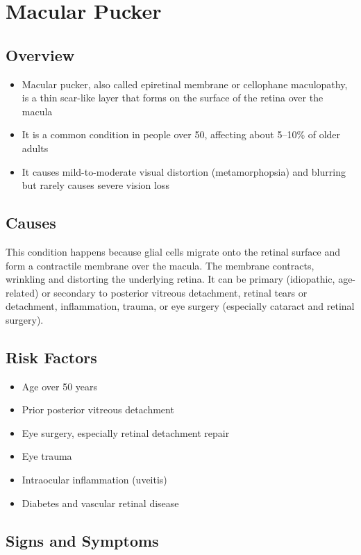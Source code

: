 \chapter{Macular Pucker}
\label{sec:Macular Pucker}

\section{Overview}
\begin{itemize}[noitemsep]
  \item Macular pucker, also called epiretinal membrane or cellophane maculopathy, is a thin scar-like layer that forms on the surface of the retina over the macula
  \item It is a common condition in people over 50, affecting about 5--10\% of older adults
  \item It causes mild-to-moderate visual distortion (metamorphopsia) and blurring but rarely causes severe vision loss
\end{itemize}
\section{Causes}
This condition happens because glial cells migrate onto the retinal surface and form a contractile membrane over the macula. The membrane contracts, wrinkling and distorting the underlying retina. It can be primary (idiopathic, age-related) or secondary to posterior vitreous detachment, retinal tears or detachment, inflammation, trauma, or eye surgery (especially cataract and retinal surgery).
\section{Risk Factors}
\begin{itemize}[noitemsep]
  \item Age over 50 years
  \item Prior posterior vitreous detachment
  \item Eye surgery, especially retinal detachment repair
  \item Eye trauma
  \item Intraocular inflammation (uveitis)
  \item Diabetes and vascular retinal disease
\end{itemize}
\section{Signs and Symptoms}
